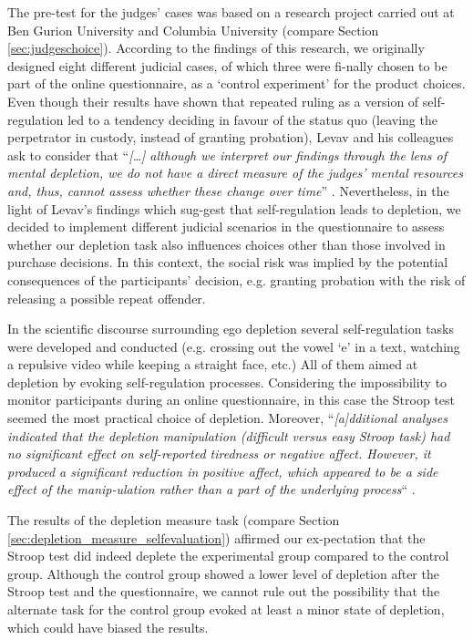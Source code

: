 The pre-test for the judges’ cases was based on a research project carried out at Ben Gurion University and Columbia University (compare Section \ref{sec:judgeschoice}). According to the findings of this research, we originally designed eight different judicial cases, of which three were fi-nally chosen to be part of the online questionnaire, as a ‘control experiment’ for the product choices. Even though their results have shown that repeated ruling as a version of self-regulation led to a tendency deciding in favour of the status quo (leaving the perpetrator in custody, instead of granting probation), Levav and his colleagues ask to consider that “\emph{[\ldots] although we interpret our findings through the lens of mental depletion, we do not have a direct measure of the judges’ mental resources and, thus, cannot assess whether these change over time}” \citep[p.~6892]{danziger2011extraneous}. Nevertheless, in the light of Levav’s findings which sug-gest that self-regulation leads to depletion, we decided to implement different judicial scenarios in the questionnaire to assess whether our depletion task also influences choices other than those involved in purchase decisions. In this context, the social risk was implied by the potential consequences of the participants’ decision, e.g. granting probation with the risk of releasing a possible repeat offender. \par
In the scientific discourse surrounding ego depletion several self-regulation tasks were developed and conducted (e.g. crossing out the vowel ‘e’ in a text, watching a repulsive video while keeping a straight face, etc.) All of them aimed at depletion by evoking self-regulation processes. Considering the impossibility to monitor participants during an online questionnaire, in this case the Stroop test seemed the most practical choice of depletion. Moreover, “\emph{[a]dditional analyses indicated that the depletion manipulation (difficult versus easy Stroop task) had no significant effect on self-reported tiredness or negative affect. However, it produced a significant reduction in positive affect, which appeared to be a side effect of the manip-ulation rather than a part of the underlying process}“ \citep[p.~350]{pocheptsova2009deciding}.\par
The results of the depletion measure task (compare Section \ref{sec:depletion_measure_selfevaluation}) affirmed our ex-pectation that the Stroop test did indeed deplete the experimental group compared to the control group. Although the control group showed a lower level of depletion after the Stroop test and the questionnaire, we cannot rule out the possibility that the alternate task for the control group evoked at least a minor state of depletion, which could have biased the results.\par
